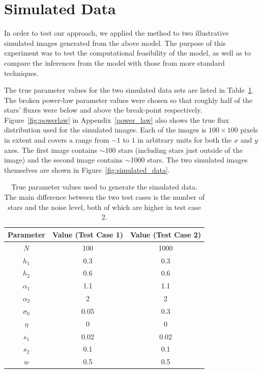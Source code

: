 \documentclass[manuscript]{aastex}
\begin{document}
\section{Simulated Data}\label{sec:simulated_data}
In order to test our approach, we applied the method to two illustrative
simulated images generated from
the above model. The purpose of this experiment was to test the computational
feasibility of the model, as well as to compare the inferences from the model
with those from more standard techniques.

The true parameter values for the two simulated data sets are listed in
Table~\ref{tab:truth}. The broken power-law parameter values were chosen so that
roughly half of the stars' fluxes were below and above the break-point
respectively. Figure~\ref{fig:powerlaw} in Appendix~\ref{power_law} also shows the true flux distribution
used for the simulated images. Each of the images
is $100 \times 100$ pixels in extent and covers a range from $-1$ to $1$ in
arbitrary units for both the $x$ and $y$ axes. The first image contains
$\sim$100 stars (including stars just outside of the image) and the second
image contains $\sim$1000 stars. The two simulated images themselves
are shown in Figure~\ref{fig:simulated_data}.

\begin{table}\footnotesize
\begin{center}
\begin{tabular}{|c|c|c|}
\hline
Parameter & Value (Test Case 1) & Value (Test Case 2)\\
\hline
$N$ & 100 & 1000\\
$h_1$ & 0.3 & 0.3\\
$h_2$ & 0.6 & 0.6\\
$\alpha_1$ & 1.1 & 1.1\\
$\alpha_2$ & 2 & 2\\
\hline
$\sigma_0$ & 0.05 & 0.3\\
$\eta$ & 0 & 0 \\
$s_1$ & 0.02 & 0.02\\
$s_2$ & 0.1 & 0.1\\
$w$ & 0.5 & 0.5\\
\hline
\end{tabular}
\end{center}
\caption{True parameter values used to generate the simulated data. The main
difference between the two test cases is the number of stars and the noise
level, both of which are higher in test case 2.
\label{tab:truth}}
\end{table}
\end{document}
